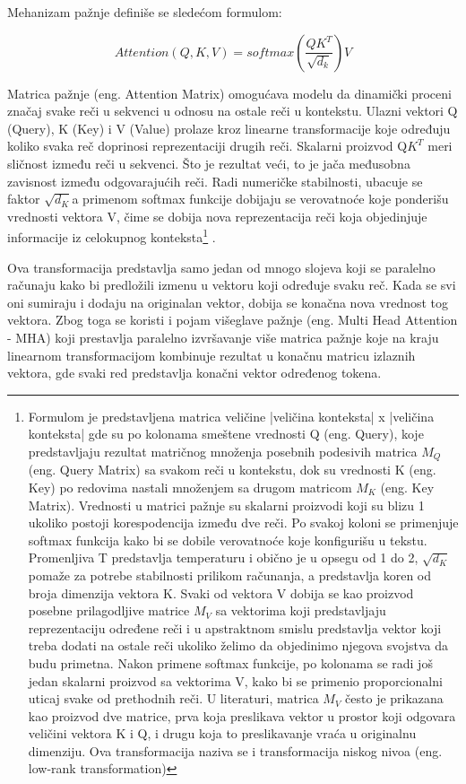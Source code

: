 \documentclass[12pt,oneside]{memoir}
\begin{document}
Mehanizam pažnje definiše se sledećom formulom:

\begin{equation}
	Attention(Q,K,V) = softmax(\frac{QK^T}{\sqrt{d_k}})V
\end{equation}

Matrica pažnje (eng. Attention Matrix) omogućava modelu da dinamički proceni značaj svake reči u sekvenci u odnosu na ostale reči u kontekstu. Ulazni vektori Q (Query), K (Key) i V (Value) prolaze kroz linearne transformacije koje određuju koliko svaka reč doprinosi reprezentaciji drugih reči. Skalarni proizvod Q\(K^T\) meri sličnost između reči u sekvenci. Što je rezultat veći, to je jača međusobna zavisnost između odgovarajućih reči. Radi numeričke stabilnosti, ubacuje se faktor \(\sqrt{d_K}\)a primenom softmax funkcije dobijaju se verovatnoće koje ponderišu vrednosti vektora V, čime se dobija nova reprezentacija reči koja objedinjuje informacije iz celokupnog konteksta\footnote{Formulom je predstavljena matrica veličine |veličina konteksta| x |veličina konteksta| gde su po kolonama smeštene vrednosti Q (eng. Query), koje predstavljaju rezultat matričnog množenja posebnih podesivih matrica \(M_Q\)(eng. Query Matrix) sa svakom reči u kontekstu, dok su vrednosti K (eng. Key) po redovima nastali množenjem sa drugom matricom \(M_K\) (eng. Key Matrix). Vrednosti u matrici pažnje su skalarni proizvodi koji su blizu 1 ukoliko postoji korespodencija između dve reči. Po svakoj koloni se primenjuje softmax funkcija kako bi se dobile verovatnoće koje konfigurišu u tekstu. Promenljiva T predstavlja temperaturu i obično je u opsegu od 1 do 2, \(\sqrt{d_K}\) 
	pomaže za potrebe stabilnosti prilikom računanja, a predstavlja koren od broja dimenzija vektora K. Svaki od vektora V dobija se kao proizvod posebne prilagodljive matrice \(M_V\) sa vektorima koji predstavljaju reprezentaciju određene reči i u apstraktnom smislu predstavlja vektor koji treba dodati na ostale reči ukoliko želimo da objedinimo njegova svojstva da budu primetna. Nakon primene softmax funkcije, po kolonama se radi još jedan skalarni proizvod sa vektorima V, kako bi se primenio proporcionalni uticaj svake od prethodnih reči. U literaturi, matrica \(M_V\) često je prikazana kao proizvod dve matrice, prva koja preslikava vektor u prostor koji odgovara veličini vektora K i Q, i drugu koja to preslikavanje vraća u originalnu dimenziju. Ova transformacija naziva se i transformacija niskog nivoa (eng. low-rank transformation) }
.

Ova transformacija predstavlja samo jedan od mnogo slojeva koji se paralelno računaju kako bi predložili izmenu u vektoru koji određuje svaku reč. Kada se svi oni sumiraju i dodaju na originalan vektor, dobija se konačna nova vrednost tog vektora. Zbog toga se koristi i pojam višeglave pažnje (eng. Multi Head Attention - MHA) koji prestavlja paralelno izvršavanje više matrica pažnje koje na kraju linearnom transformacijom kombinuje rezultat u konačnu matricu izlaznih vektora, gde svaki red predstavlja konačni vektor određenog tokena.
\end{document}
